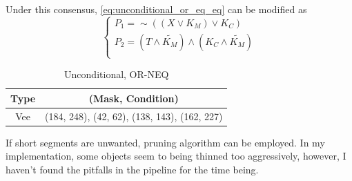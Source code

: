 \documentclass[12pt]{article}
\begin{document}
Under this consensus, \autoref{eq:unconditional_or_eq_eq} can be modified as
\begin{equation}
\begin{cases}
	P_1 = \sim ((X \vee K_M) \vee K_C) \\
	P_2 = (T \wedge \tilde{K_M}) \wedge (K_C \wedge \tilde{K_M})\\
\end{cases}
\label{eq:unconditional_or_eq_eq}
\end{equation}

\begin{table}[H]
\caption{Unconditional, OR-NEQ}
	\centering
	\begin{tabular}{c|c}	
	Type & (Mask, Condition) \\
	\hline
	\hline
	Vee & (184, 248), (42, 62), (138, 143), (162, 227) \\
	\end{tabular}
\end{table}

If short segments are unwanted, pruning algorithm can be employed. In my implementation, some objects seem to being thinned too aggressively, however, I haven't found the pitfalls in the pipeline for the time being. 
\end{document}
